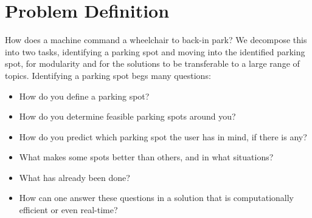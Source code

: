 % 
% 
% 
% 
% 
% 


\section{Problem Definition}
How does a machine command a wheelchair to back-in park? We decompose this into two
tasks, identifying a parking spot and moving into the identified parking spot,
for modularity and for the solutions to be transferable to a large range of
topics.
Identifying a parking spot begs many questions:
\begin{itemize}
\item How do you define a parking spot?
\item How do you determine feasible parking spots around you?
\item How do you predict which parking spot the user has in mind, if there is any?
\item What makes some spots better than others, and in what situations?
\item What has already been done?
\item How can one answer these questions in a solution that is 
computationally efficient or even real-time?
\end{itemize}

